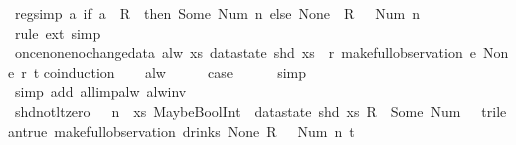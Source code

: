 \begin{isabellebody}
%
\endisatagproof
{\isafoldproof}%
%
\isadelimproof
\isanewline
%
\endisadelimproof
\isanewline
{}\isamarkupfalse%
\ reg{\isacharunderscore}simp{\isacharcolon}\ {\isachardoublequoteopen}{\isacharparenleft}{\isasymlambda}a{\isachardot}\ if\ a\ {\isacharequal}\ R\ {}\ then\ Some\ {\isacharparenleft}Num\ n{\isacharparenright}\ else\ None{\isacharparenright}\ {\isacharequal}\ {\isacharless}R\ {}\ {\isacharcolon}{\isacharequal}\ Num\ n{\isachargreater}{\isachardoublequoteclose}\isanewline
%
\isadelimproof
\ \ %
\endisadelimproof
%
\isatagproof
{}\isamarkupfalse%
\ {\isacharparenleft}rule\ ext{\isacharcomma}\ simp{\isacharparenright}%
\endisatagproof
{\isafoldproof}%
%
\isadelimproof
\isanewline
%
\endisadelimproof
\isanewline
{}\isamarkupfalse%
\ once{\isacharunderscore}none{\isacharunderscore}no{\isacharunderscore}change{\isacharunderscore}data{\isacharcolon}\ {\isachardoublequoteopen}alw\ {\isacharparenleft}{\isasymlambda}xs{\isachardot}\ {\isacharparenleft}datastate\ {\isacharparenleft}shd\ xs{\isacharparenright}{\isacharparenright}\ {\isacharequal}\ r{\isacharparenright}\ {\isacharparenleft}make{\isacharunderscore}full{\isacharunderscore}observation\ e\ None\ r\ t{\isacharparenright}{\isachardoublequoteclose}\isanewline
%
\isadelimproof
%
\endisadelimproof
%
\isatagproof
{}\isamarkupfalse%
{\isacharparenleft}coinduction{\isacharparenright}\isanewline
\ \ \isamarkupfalse%
\ alw\isanewline
\ \ \isamarkupfalse%
\ \isamarkupfalse%
\ {\isacharquery}case\isanewline
\ \ \ \ \isamarkupfalse%
\ simp\isanewline
\ \ \ \ \isamarkupfalse%
\ {\isacharparenleft}simp\ add{\isacharcolon}\ all{\isacharunderscore}imp{\isacharunderscore}alw\ alw{\isacharunderscore}inv{\isacharparenright}\isanewline
{}\isamarkupfalse%
%
\endisatagproof
{\isafoldproof}%
%
\isadelimproof
\isanewline
%
\endisadelimproof
\isanewline
{}\isamarkupfalse%
\ shd{\isacharunderscore}not{\isacharunderscore}lt{\isacharunderscore}zero{\isacharcolon}\ {\isachardoublequoteopen}{}\ {\isasymle}\ n\ {\isasymLongrightarrow}\ {\isacharparenleft}{\isasymlambda}xs{\isachardot}\ MaybeBoolInt\ {\isacharparenleft}{\isacharless}{\isacharparenright}\ {\isacharparenleft}datastate\ {\isacharparenleft}shd\ xs{\isacharparenright}\ {\isacharparenleft}R\ {}{\isacharparenright}{\isacharparenright}\ {\isacharparenleft}Some\ {\isacharparenleft}Num\ {}{\isacharparenright}{\isacharparenright}\ {\isasymnoteq}\ trilean{\isachardot}true{\isacharparenright}\ {\isacharparenleft}make{\isacharunderscore}full{\isacharunderscore}observation\ drinks\ None\ {\isacharless}R\ {}\ {\isacharcolon}{\isacharequal}\ Num\ n{\isachargreater}\ t{\isacharparenright}{\isachardoublequoteclose}\isanewline

\end{isabellebody}
